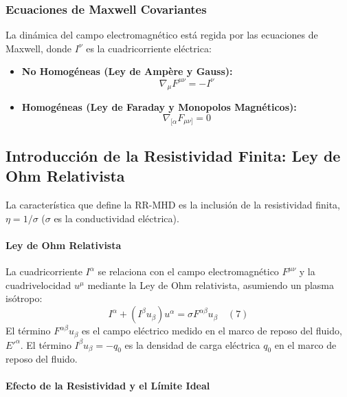 \subsubsection{Ecuaciones de Maxwell Covariantes}

La dinámica del campo electromagnético está regida por las ecuaciones de Maxwell, donde $I^\nu$ es la cuadricorriente eléctrica:

\begin{itemize}
    \item \textbf{No Homogéneas (Ley de Ampère y Gauss):}
    \begin{equation}
        \nabla_\mu F^{\mu\nu} = -I^\nu
    \end{equation}
    \item \textbf{Homogéneas (Ley de Faraday y Monopolos Magnéticos):}
    \begin{equation}
        \nabla_{[\alpha} F_{\mu\nu]} = 0
    \end{equation}
\end{itemize}

\subsection{Introducción de la Resistividad Finita: Ley de Ohm Relativista}

La característica que define la RR-MHD es la inclusión de la resistividad finita, $\eta = 1/\sigma$ ($\sigma$ es la conductividad eléctrica).

\paragraph{Ley de Ohm Relativista}
La cuadricorriente $I^\alpha$ se relaciona con el campo electromagnético $F^{\mu\nu}$ y la cuadrivelocidad $u^\mu$ mediante la Ley de Ohm relativista, asumiendo un plasma isótropo:
\begin{equation}
I^\alpha + (I^\beta u_\beta) u^\alpha = \sigma F^{\alpha\beta} u_\beta \quad (7)
\end{equation}
El término $F^{\alpha\beta} u_\beta$ es el campo eléctrico medido en el marco de reposo del fluido, $E'^\alpha$. El término $I^\beta u_\beta = -q_0$ es la densidad de carga eléctrica $q_0$ en el marco de reposo del fluido.

\paragraph{Efecto de la Resistividad y el Límite Ideal}

